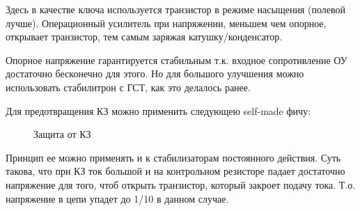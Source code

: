 Здесь в качестве ключа используется транзистор в режиме насыщения  (полевой лучше). Операционный усилитель при напряжении, меньшем чем опорное, открывает транзистор, тем самым заряжая катушку/конденсатор. 


Опорное напряжение гарантируется стабильным т.к. входное сопротивление ОУ достаточно бесконечно для этого.
Но для большого улучшения можно использовать стабилитрон с ГСТ, как это делалось ранее.


Для предотвращения КЗ можно применить следующею self-made фичу:

\begin{center}
	\begin{figure}[h!]
		\caption{Защита от КЗ}	
	\end{figure}
\end{center}
Принцип ее можно применять и к стабилизаторам постоянного действия.
Суть такова, что при КЗ ток большой и на контрольном резисторе падает достаточно напряжение для того, чтоб открыть транзистор, который закроет подачу тока. Т.о. напряжение в цепи упадет до 1/10 в данном случае.

